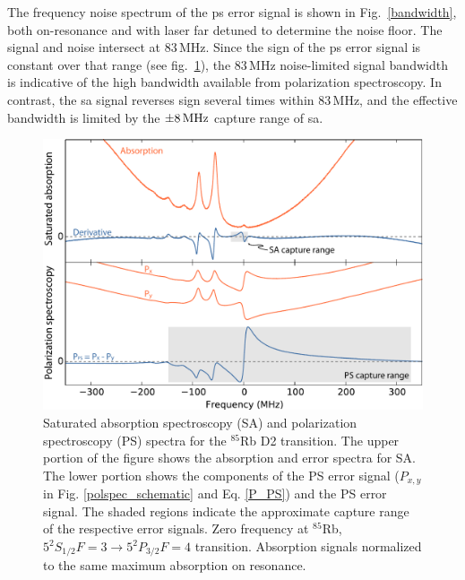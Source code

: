 The frequency noise spectrum of the \gls*{ps} error signal is shown in  Fig.~\ref{bandwidth}, both on-resonance and with laser far detuned to determine the noise floor.  The signal and noise intersect at 83\,MHz.  Since the sign of the \gls*{ps} error signal is constant over that range (see fig.~\ref{sa_ps_spectra}), the 83\,MHz noise-limited signal bandwidth is indicative of the high bandwidth available from polarization spectroscopy.  In contrast, the \gls*{sa} signal reverses sign several times within 83\,MHz, and the effective bandwidth is limited by the $\pm 8\rm\,MHz$ capture range of \gls*{sa}.

\begin{figure}[htbp]
    \centering
    \includegraphics[width=\linewidth]{chapter1/Figs/fig2_v1.pdf}
    \caption{Saturated absorption spectroscopy (SA) and polarization spectroscopy (PS) spectra for the $^{85}$Rb D2 transition. The upper portion of the figure shows the absorption and error spectra for SA. The lower portion shows the components of the PS error signal ($P_{x,y}$ in Fig. \ref{polspec_schematic} and Eq. \ref{P_PS}) and the PS error signal. The shaded regions indicate the approximate capture range of the respective error signals. Zero frequency at $^{85}$Rb, $5^2S_{1/2} F=3\rightarrow5^2P_{3/2} F=4$ transition.  Absorption signals normalized to the same maximum absorption on resonance.}
    \label{sa_ps_spectra}
\end{figure}

